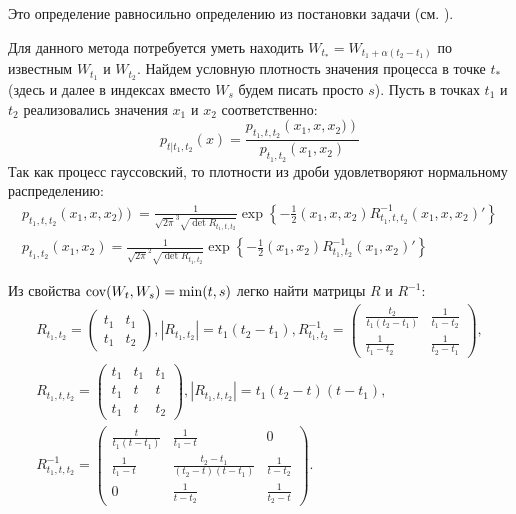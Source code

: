 \documentclass[12pt, a4paper]{article}
\begin{document}
Это определение равносильно определению из постановки задачи (см. \cite{gihman_skorohod}).

Для данного метода потребуется уметь находить $W_{t_*}=W_{t_1+\alpha\left( t_2-t_1\right)}$ по известным $W_{t_1}$ и $W_{t_2}$. Найдем условную плотность значения процесса в точке $t_*$(здесь и далее в индексах вместо $W_s$ будем писать просто $s$). Пусть в точках $t_1$ и $t_2$ реализовались значения $x_1$ и $x_2$ соответственно:
\[ p_{t\left|t_1,t_2\right. }\left( x\right) = 
	\frac{p_{t_1,t,t_2} \left( x_1,x,x_2) \right) } 
	     {p_{t_1,t_2} \left( x_1,x_2 \right) }\]
Так как процесс гауссовский, то плотности из дроби удовлетворяют нормальному распределению:
\begin{gather*}
	p_{t_1,t,t_2} \left( x_1,x,x_2) \right) = 
		\frac{1}{\sqrt{2\pi }^3 \sqrt{\det{R_{t_1,t,t_2}}} }
		\exp\left\{ -\frac 12 (x_1,x,x_2)R_{t_1,t,t_2}^{-1}(x_1,x,x_2)' \right\} \\
	p_{t_1,t_2} \left( x_1,x_2 \right) = 
		\frac{1}{\sqrt{2\pi}^2\sqrt{\det{R_{t_1,t_2}}}}
		\exp\left\{ -\frac 12 (x_1,x_2)R_{t_1,t_2}^{-1}(x_1,x_2)' \right\}
\end{gather*}

Из свойства $\operatorname{cov}(W_t,W_s) = \min(t,s)$ легко найти матрицы $R$ и $R^{-1}$:
\begin{gather*}
	R_{t_1,t_2} = 
		\begin{pmatrix}
			t_1 & t_1 \\
			t_1 & t_2
		\end{pmatrix}, 
		\left| R_{t_1,t_2} \right| = t_1\left(t_2-t_1\right),
		R_{t_1,t_2}^{-1} = 
		\begin{pmatrix}
			\frac{t_2}{t_1\left(t_2-t_1\right)} & \frac 1 {t_1 - t_2} \\
			\frac 1 {t_1 - t_2} & \frac 1 {t_2 - t_1}
		\end{pmatrix},
\\
	R_{t_1,t,t_2} = \begin{pmatrix}
			t_1 & t_1 & t_1 \\
			t_1 & t & t \\
			t_1 & t & t_2
		\end{pmatrix},
		\left| R_{t_1,t,t_2} \right| = t_1\left( t_2 - t\right) \left( t - t_1\right),
\\
		R_{t_1,t,t_2}^{-1} = \begin{pmatrix}
			\frac{t}{t_1\left(t-t_1\right)} & \frac{1}{t_1-t} & 0\\
			\frac{1}{t_1-t} & \frac{t_2 - t_1}{\left(t_2-t\right)\left(t-t_1\right)} & \frac{1}{t-t_2} \\
			0 &  \frac{1}{t-t_2} & \frac{1}{t_2-t}
		\end{pmatrix}.
\end{gather*}
\end{document}
